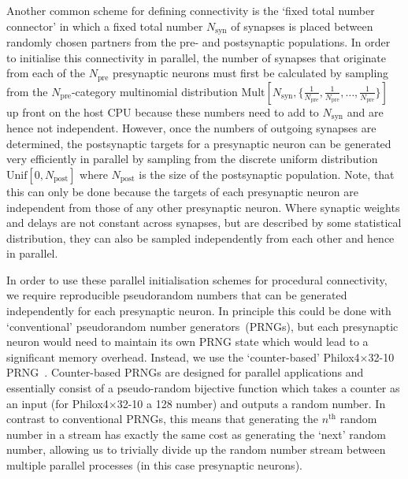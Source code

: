 \documentclass[9pt,a4paper]{amsart}
\newcommand{\todo}[1]{\textbf{\textsc{\textcolor{red}{(TODO: #1)}}}}
\begin{document}
Another common scheme for defining connectivity is the `fixed total number connector' in which a fixed total number $N_{\text{syn}}$ of synapses is placed between randomly chosen partners from the pre- and postsynaptic populations.
In order to initialise this connectivity in parallel, the number of synapses that originate from each of the $N_{\text{pre}}$ presynaptic neurons must first be calculated by sampling from the $N_{\text{pre}}$-category multinomial distribution $\text{Mult}[N_{\text{syn}}, \{\frac{1}{N_{\text{pre}}}, \frac{1}{N_{\text{pre}}}, \ldots, \frac{1}{N_{\text{pre}}}\}]$ up front on the host CPU because these numbers need to add to $N_{\text{syn}}$ and are hence not independent.
However, once the numbers of outgoing synapses are determined, the postsynaptic targets for a presynaptic neuron can be generated very efficiently in parallel by sampling from the discrete uniform distribution $\text{Unif}[0, N_{\text{post}}]$ where $N_{\text{post}}$ is the size of the postsynaptic population.
Note, that this can only be done because the targets of each presynaptic neuron are independent from those of any other presynaptic neuron.
Where synaptic weights and delays are not constant across synapses, but are described by some statistical distribution, they can also be sampled independently from each other and hence in parallel.
%

In order to use these parallel initialisation schemes for procedural connectivity, we require reproducible pseudorandom numbers that can be generated independently for each presynaptic neuron.
In principle this could be done with `conventional' pseudorandom  number generators~(PRNGs), but each presynaptic neuron would need to maintain its own PRNG state which would lead to a significant memory overhead.
Instead, we use the `counter-based' Philox4$\times$32-10 PRNG~\citep{Salmon2011}.
Counter-based PRNGs are designed for parallel applications and essentially consist of a pseudo-random bijective function which takes a counter as an input (for Philox4$\times$32-10 a \SI{128}{\bit} number) and outputs a random number.
In contrast to conventional PRNGs, this means that generating the $n^\text{th}$ random number in a stream has exactly the same cost as generating the `next' random number, allowing us to trivially divide up the random number stream between multiple parallel processes (in this case presynaptic neurons).
\end{document}
